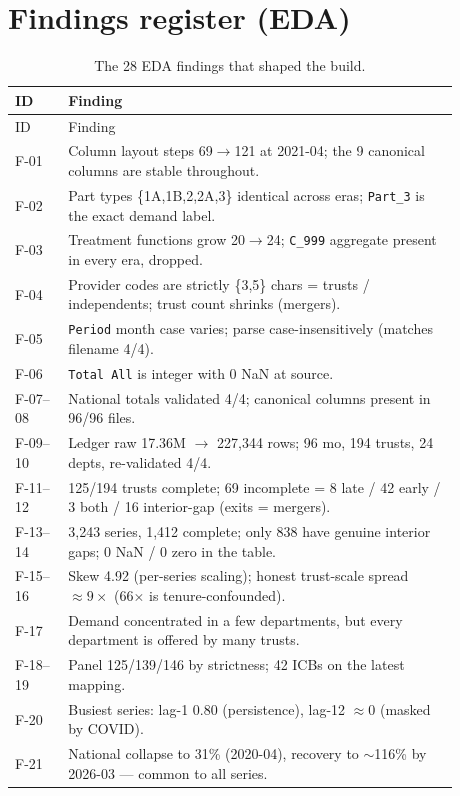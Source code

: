 \documentclass[11pt,a4paper]{article}
\newcommand{\code}[1]{\texttt{\small #1}}
\begin{document}
\section{Findings register (EDA)}\label{sec:findings}
\small
\begin{longtable}{@{}l p{0.88\linewidth}@{}}
\caption{The 28 EDA findings that shaped the build.}\label{tab:findings}\\
\toprule ID & Finding \\ \midrule \endfirsthead \toprule ID & Finding \\ \midrule \endhead \bottomrule \endfoot
F-01 & Column layout steps 69$\to$121 at 2021-04; the 9 canonical columns are stable throughout. \\
F-02 & Part types \{1A,1B,2,2A,3\} identical across eras; \code{Part\_3} is the exact demand label. \\
F-03 & Treatment functions grow 20$\to$24; \code{C\_999} aggregate present in every era, dropped. \\
F-04 & Provider codes are strictly \{3,5\} chars = trusts / independents; trust count shrinks (mergers). \\
F-05 & \code{Period} month case varies; parse case-insensitively (matches filename 4/4). \\
F-06 & \code{Total All} is integer with 0 NaN at source. \\
F-07--08 & National totals validated 4/4; canonical columns present in 96/96 files. \\
F-09--10 & Ledger raw 17.36M $\to$ 227{,}344 rows; 96 mo, 194 trusts, 24 depts, re-validated 4/4. \\
F-11--12 & 125/194 trusts complete; 69 incomplete = 8 late / 42 early / 3 both / 16 interior-gap (exits = mergers). \\
F-13--14 & 3{,}243 series, 1{,}412 complete; only 838 have genuine interior gaps; 0 NaN / 0 zero in the table. \\
F-15--16 & Skew 4.92 (per-series scaling); honest trust-scale spread $\approx9\times$ (66$\times$ is tenure-confounded). \\
F-17 & Demand concentrated in a few departments, but every department is offered by many trusts. \\
F-18--19 & Panel 125/139/146 by strictness; 42 ICBs on the latest mapping. \\
F-20 & Busiest series: lag-1 $0.80$ (persistence), lag-12 $\approx0$ (masked by COVID). \\
F-21 & National collapse to 31\% (2020-04), recovery to $\sim$116\% by 2026-03 --- common to all series. \\

\end{longtable}
\end{document}
